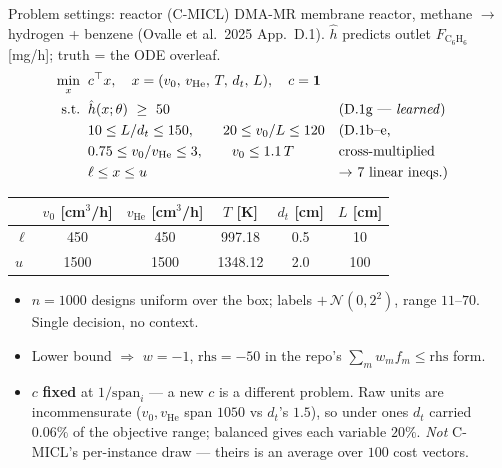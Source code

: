 \documentclass{beamer}
\begin{document}
\begin{frame}{Problem settings: reactor (C-MICL)}
  \small
  DMA-MR membrane reactor, methane $\to$ hydrogen + benzene (Ovalle et al.\ 2025
  App.~D.1). $\hat h$ predicts outlet $F_{\mathrm{C_6H_6}}$ [mg/h]; truth = the
  ODE overleaf.
  \vspace{-0.3em}
  \[
    \begin{aligned}
      \min_{x}\;\; & c^\top x, \quad x=(v_0,\,v_{\mathrm{He}},\,T,\,d_t,\,L),
        \quad c=\mathbf 1 \\
      \text{s.t.}\;\; & \hat h(x;\theta)\ \ge\ 50 && \text{(D.1g --- \emph{learned})}\\
      & 10 \le L/d_t \le 150, \qquad 20 \le v_0/L \le 120 && \text{(D.1b--e,}\\
      & 0.75 \le v_0/v_{\mathrm{He}} \le 3, \qquad v_0 \le 1.1\,T
        && \text{cross-multiplied}\\
      & \ell \le x \le u && \text{$\to$ 7 linear ineqs.)}
    \end{aligned}
  \]
  \vspace{-1.1em}
  \begin{center}\footnotesize
  \begin{tabular}{@{}lccccc@{}}
    \toprule
      & $v_0$ [cm$^3$/h] & $v_{\mathrm{He}}$ [cm$^3$/h] & $T$ [K] & $d_t$ [cm] & $L$ [cm] \\
    \midrule
    $\ell$ & 450 & 450 & 997.18 & 0.5 & 10 \\
    $u$    & 1500 & 1500 & 1348.12 & 2.0 & 100 \\
    \bottomrule
  \end{tabular}
  \end{center}
  \vspace{-0.5em}
  \begin{itemize}
    \item $n=1000$ designs uniform over the box; labels $+\,\mathcal N(0,2^2)$,
      range $11$--$70$. Single decision, no context.
    \item Lower bound $\Rightarrow$ $w=-1$, $\text{rhs}=-50$ in the repo's
      $\sum_m w_mf_m\le\text{rhs}$ form.
    \item $c$ \textbf{fixed} at $1/\mathrm{span}_i$ --- a new $c$ is a different
      problem. Raw units are incommensurate ($v_0,v_{\mathrm{He}}$ span $1050$ vs
      $d_t$'s $1.5$), so under ones $d_t$ carried $0.06\%$ of the objective range;
      balanced gives each variable $20\%$. \emph{Not} C-MICL's per-instance draw
      --- theirs is an average over $100$ cost vectors.
  \end{itemize}
\end{frame}
\end{document}
